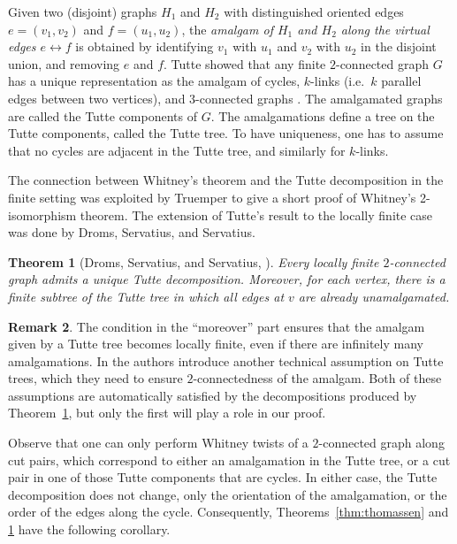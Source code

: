 \documentclass{article}
\theoremstyle{plain}
\newtheorem{thm}{Theorem}[section]
\theoremstyle{definition}
\newtheorem{rem}[thm]{Remark}
\begin{document}
Given two (disjoint) graphs $H_1$ and $H_2$ with distinguished oriented edges $e=(v_1,v_2)$ and $f=(u_1,u_2)$, the \emph{amalgam of $H_1$ and $H_2$ along the virtual edges $e \leftrightarrow f$} is obtained by identifying $v_1$ with $u_1$ and $v_2$ with $u_2$ in the disjoint union, and removing $e$ and $f$. Tutte showed that any finite $2$-connected graph $G$ has a unique representation as the amalgam of cycles, $k$-links (i.e.\ $k$ parallel edges between two vertices), and $3$-connected graphs \cite{tutte1966connectivity}. The amalgamated graphs are called the Tutte components of $G$. The amalgamations define a tree on the Tutte components, called the Tutte tree. To have uniqueness, one has to assume that no cycles are adjacent in the Tutte tree, and similarly for $k$-links. 

The connection between Whitney's theorem and the Tutte decomposition in the
finite setting was exploited by Truemper \cite{truemper80whitney} to give a short proof
of Whitney's 2-isomorphism theorem. The extension of Tutte's result to the locally finite case was done by Droms, Servatius, and Servatius. 
\begin{thm}[Droms, Servatius, and Servatius, {\cite[Theorem 1]{droms1995structure}}] \label{thm:droms_servatius_servatius}
    Every locally finite $2$-connected graph admits a unique Tutte decomposition. Moreover, for each vertex, there is a finite subtree of the Tutte tree in which all edges at \(v\) are already unamalgamated.
\end{thm}

\begin{rem}
    The condition in the ``moreover'' part ensures that the amalgam given by a Tutte tree becomes locally finite, even if there are infinitely many amalgamations. In \cite{droms1995structure} the authors introduce another technical assumption on Tutte trees, which they need to ensure $2$-connectedness of the amalgam. Both of these assumptions are automatically satisfied by the decompositions produced by Theorem~\ref{thm:droms_servatius_servatius}, but only the first will play a role in our proof. 
\end{rem}

Observe that one can only perform Whitney twists of a $2$-connected graph along cut pairs, which correspond to either an amalgamation in the Tutte tree, or a cut pair in one of those Tutte components that are cycles. In either case, the Tutte decomposition does not change, only the orientation of the amalgamation, or the order of the edges along the cycle. Consequently, Theorems~\ref{thm:thomassen} and \ref{thm:droms_servatius_servatius} have the following corollary.
\end{document}
